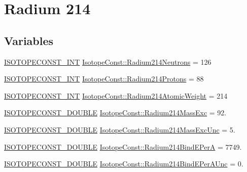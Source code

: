 \hypertarget{group___isotope_const-_radium-_ra214}{}\section{Radium 214}
\label{group___isotope_const-_radium-_ra214}
\subsection*{Variables}
\begin{DoxyCompactItemize}
\item 
\mbox{\hyperlink{group___isotope_const-_macros_ga5f18360b3e99483a35c32d789e62621c}{I\+S\+O\+T\+O\+P\+E\+C\+O\+N\+S\+T\+\_\+\+I\+NT}} \mbox{\hyperlink{group___isotope_const-_radium-_ra214_ga87a3113df89181e45c920e07718ff9a8}{Isotope\+Const\+::\+Radium214\+Neutrons}} = 126
\item 
\mbox{\hyperlink{group___isotope_const-_macros_ga5f18360b3e99483a35c32d789e62621c}{I\+S\+O\+T\+O\+P\+E\+C\+O\+N\+S\+T\+\_\+\+I\+NT}} \mbox{\hyperlink{group___isotope_const-_radium-_ra214_ga38c46286182c90617cd66f6131caf741}{Isotope\+Const\+::\+Radium214\+Protons}} = 88
\item 
\mbox{\hyperlink{group___isotope_const-_macros_ga5f18360b3e99483a35c32d789e62621c}{I\+S\+O\+T\+O\+P\+E\+C\+O\+N\+S\+T\+\_\+\+I\+NT}} \mbox{\hyperlink{group___isotope_const-_radium-_ra214_gaf2a700c6603025241d83a124c89c1779}{Isotope\+Const\+::\+Radium214\+Atomic\+Weight}} = 214
\item 
\mbox{\hyperlink{group___isotope_const-_macros_ga8f45a7272ce02c0b4c65c44636ed719a}{I\+S\+O\+T\+O\+P\+E\+C\+O\+N\+S\+T\+\_\+\+D\+O\+U\+B\+LE}} \mbox{\hyperlink{group___isotope_const-_radium-_ra214_gaf3c7c34b260e3282638b55793440f700}{Isotope\+Const\+::\+Radium214\+Mass\+Exc}} = 92.
\item 
\mbox{\hyperlink{group___isotope_const-_macros_ga8f45a7272ce02c0b4c65c44636ed719a}{I\+S\+O\+T\+O\+P\+E\+C\+O\+N\+S\+T\+\_\+\+D\+O\+U\+B\+LE}} \mbox{\hyperlink{group___isotope_const-_radium-_ra214_ga28f316b2aef2da2cdf98155a9ea9151e}{Isotope\+Const\+::\+Radium214\+Mass\+Exc\+Unc}} = 5.
\item 
\mbox{\hyperlink{group___isotope_const-_macros_ga8f45a7272ce02c0b4c65c44636ed719a}{I\+S\+O\+T\+O\+P\+E\+C\+O\+N\+S\+T\+\_\+\+D\+O\+U\+B\+LE}} \mbox{\hyperlink{group___isotope_const-_radium-_ra214_gac9b581d3c4bf30c4f9dee54463287f96}{Isotope\+Const\+::\+Radium214\+Bind\+E\+PerA}} = 7749.
\item 
\mbox{\hyperlink{group___isotope_const-_macros_ga8f45a7272ce02c0b4c65c44636ed719a}{I\+S\+O\+T\+O\+P\+E\+C\+O\+N\+S\+T\+\_\+\+D\+O\+U\+B\+LE}} \mbox{\hyperlink{group___isotope_const-_radium-_ra214_gad258f7319f2012a423c6012f490d6af1}{Isotope\+Const\+::\+Radium214\+Bind\+E\+Per\+A\+Unc}} = 0.

\end{DoxyCompactItemize}
